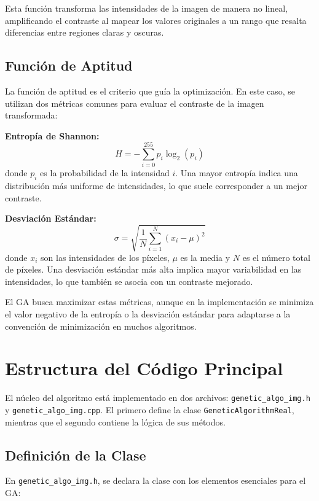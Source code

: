 Esta función transforma las intensidades de la imagen de manera no lineal, amplificando el contraste al mapear los valores originales a un rango que resalta diferencias entre regiones claras y oscuras.

\subsection{Función de Aptitud}
La función de aptitud es el criterio que guía la optimización. En este caso, se utilizan dos métricas comunes para evaluar el contraste de la imagen transformada:

\textbf{Entropía de Shannon:}
\begin{equation}
    H = -\sum_{i=0}^{255} p_i \log_2(p_i)
\end{equation}
donde \(p_i\) es la probabilidad de la intensidad \(i\). Una mayor entropía indica una distribución más uniforme de intensidades, lo que suele corresponder a un mejor contraste.

\textbf{Desviación Estándar:}
\begin{equation}
    \sigma = \sqrt{\frac{1}{N} \sum_{i=1}^{N} (x_i - \mu)^2}
\end{equation}
donde \(x_i\) son las intensidades de los píxeles, \(\mu\) es la media y \(N\) es el número total de píxeles. Una desviación estándar más alta implica mayor variabilidad en las intensidades, lo que también se asocia con un contraste mejorado.

El GA busca maximizar estas métricas, aunque en la implementación se minimiza el valor negativo de la entropía o la desviación estándar para adaptarse a la convención de minimización en muchos algoritmos.

\section{Estructura del Código Principal}\label{sec:estructura_codigo}

El núcleo del algoritmo está implementado en dos archivos: \texttt{genetic\_algo\_img.h} y \texttt{genetic\_algo\_img.cpp}. El primero define la clase \texttt{GeneticAlgorithmReal}, mientras que el segundo contiene la lógica de sus métodos.

\subsection{Definición de la Clase}\label{subsec:definicion_clase}

En \texttt{genetic\_algo\_img.h}, se declara la clase con los elementos esenciales para el GA:

